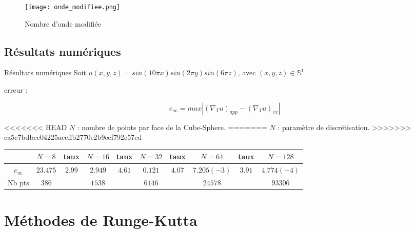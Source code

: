 \documentclass[11pt]{beamer}
\begin{document}
\begin{frame}
\begin{figure}
\begin{center}
\texttt{[image: onde\_modifiee.png]}
\caption{Nombre d'onde modifiée}
\end{center}
\end{figure}

\end{frame}

\subsection{Résultats numériques}
\begin{frame}{Résultats numériques}
Soit $u(x,y,z) = sin(10 \pi x)sin(2 \pi y) sin(6 \pi z)$, avec
$(x,y,z) \in \mathbb{S}^1$

erreur :

$$e_{\infty} = max | (\nabla_T u)_{app} - (\nabla_T u)_{ex} |$$

<<<<<<< HEAD
$N$ : nombre de points par face de la Cube-Sphere.
=======
$N$ : paramètre de discrétisation.
>>>>>>> ca5c7bdbcc04225aecffb2770e2b9cef792c57cd

\begin{center}
\tiny{\begin{tabular}{|c||c|c|c|c|c|c|c|c|c|}
\hline 
 & $N=8$ & taux & $N=16$ & taux & $N=32$ & taux & $N=64$ & taux & $N=128$ \\ 
\hline 
\hline
$e_{\infty}$ & $23.475$ & $2.99$ & $2.949$ & $4.61$ & $0.121$ & $4.07$ & $7.205(-3)$ & $3.91$ & $4.774(-4)$ \\ 
\hline 
Nb pts & $386$ &  & $1538$ &  & $6146$ &  & $24578$ &  &
$93306$\\
\hline
\end{tabular} }
\end{center}

\end{frame}


\section{Méthodes de Runge-Kutta}
\end{document}
